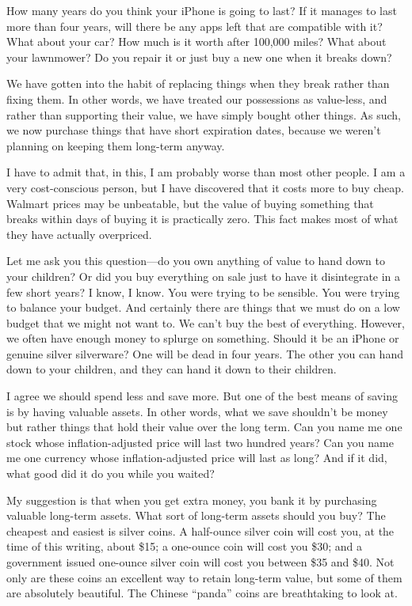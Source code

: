How many years do you think your iPhone is going to last? If it manages
to last more than four years, will there be any apps left that are
compatible with it? What about your car? How much is it worth after
100,000 miles? What about your lawnmower? Do you repair it or just buy
a new one when it breaks down?

We have gotten into the habit of replacing things when they break rather
than fixing them. In other words, we have treated our possessions as
value-less, and rather than supporting their value, we have simply
bought other things. As such, we now purchase things that have short
expiration dates, because we weren’t planning on keeping them long-term
anyway. 

I have to admit that, in this, I am probably worse than most other
people. I am a very cost-conscious person, but I have discovered that
it costs more to buy cheap. Walmart prices may be unbeatable, but the
value of buying something that breaks within days of buying it is
practically zero.  This fact makes most of what they have actually
overpriced. 

Let me ask you this question---do you own anything of value to hand down
to your children?  Or did you buy everything on sale just to have it
disintegrate in a few short years?  I know, I know. You were trying to
be sensible. You were trying to balance your budget. And certainly
there are things that we must do on a low budget that we might not want
to. We can’t buy the best of everything. However, we often have enough
money to splurge on something. Should it be an iPhone or genuine silver
silverware?  One will be dead in four years. The other you can hand
down to your children, and they can hand it down to their children.

I agree we should spend less and save more. But one of the best means of
saving is by having valuable assets. In other words, what we save
shouldn’t be money but rather things that hold their value over the
long term. Can you name me one stock whose inflation-adjusted price
will last two hundred years?  Can you name me one currency whose
inflation-adjusted price will last as long?  And if it did, what good
did it do you while you waited?

My suggestion is that when you get extra money, you bank it by
purchasing valuable long-term assets. What sort of long-term assets
should you buy? The cheapest and easiest is silver coins. A half-ounce
silver coin will cost you, at the time of this writing, about \$15; a
one-ounce coin will cost you \$30; and a government issued one-ounce
silver coin will cost you between \$35 and \$40. Not only are these
coins an excellent way to retain long-term value, but some of them are
absolutely beautiful. The Chinese ``panda'' coins are breathtaking to
look at.

